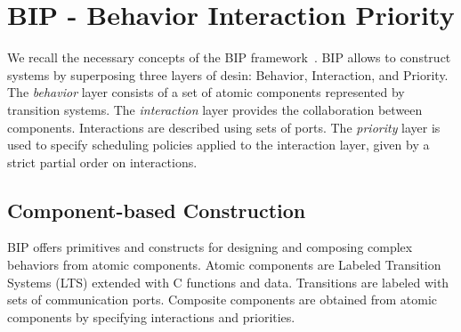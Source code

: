 \section{BIP - Behavior Interaction Priority}
\label{sec:bip}
%
We recall the necessary concepts of the BIP framework~\cite{bip11}.
BIP allows to construct systems by superposing three layers of desin: Behavior, Interaction, and Priority.
The \emph{behavior} layer consists of a set of atomic components represented by transition systems. 
The \emph{interaction} layer provides the collaboration between components. 
Interactions are described using sets of ports. 
The \emph{priority} layer is used to specify scheduling policies applied to the interaction layer, given by a strict partial order on interactions.
%
\subsection{Component-based Construction}
%
BIP offers primitives and constructs for designing and composing complex behaviors from atomic components. Atomic components are Labeled Transition Systems (LTS) extended with C functions and data. Transitions are labeled with sets of communication ports. 
Composite components are obtained from atomic components by specifying interactions and priorities.
%
%
